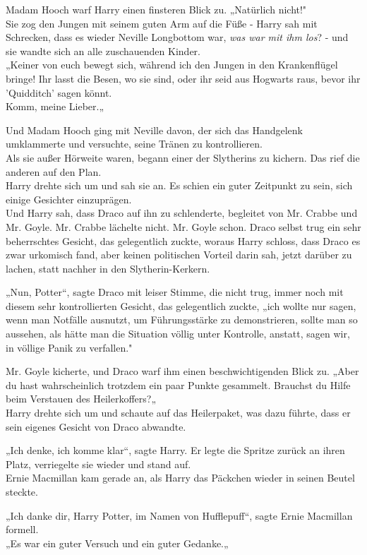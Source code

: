 {Madam Hooch warf Harry einen finsteren Blick zu. „Natürlich nicht!"\\ Sie zog den Jungen mit seinem guten Arm auf die Füße - Harry sah mit Schrecken, dass es wieder Neville Longbottom war, \emph{was war mit ihm los}? - und sie wandte sich an alle zuschauenden Kinder.\\ „Keiner von euch bewegt sich, während ich den Jungen in den Krankenflügel bringe! Ihr lasst die Besen, wo sie sind, oder ihr seid aus Hogwarts raus, bevor ihr 'Quidditch' sagen könnt.\\ Komm, meine Lieber.„

Und Madam Hooch ging mit Neville davon, der sich das Handgelenk umklammerte und versuchte, seine Tränen zu kontrollieren.\\ Als sie außer Hörweite waren, begann einer der Slytherins zu kichern. Das rief die anderen auf den Plan.\\ Harry drehte sich um und sah sie an. Es schien ein guter Zeitpunkt zu sein, sich einige Gesichter einzuprägen.\\ Und Harry sah, dass Draco auf ihn zu schlenderte, begleitet von Mr. Crabbe und Mr. Goyle. Mr. Crabbe lächelte nicht. Mr. Goyle schon. Draco selbst trug ein sehr beherrschtes Gesicht, das gelegentlich zuckte, woraus Harry schloss, dass Draco es zwar urkomisch fand, aber keinen politischen Vorteil darin sah, jetzt darüber zu lachen, statt nachher in den Slytherin-Kerkern.

„Nun, Potter“, sagte Draco mit leiser Stimme, die nicht trug, immer noch mit diesem sehr kontrollierten Gesicht, das gelegentlich zuckte, „ich wollte nur sagen, wenn man Notfälle ausnutzt, um Führungsstärke zu demonstrieren, sollte man so aussehen, als hätte man die Situation völlig unter Kontrolle, anstatt, sagen wir, in völlige Panik zu verfallen."

Mr. Goyle kicherte, und Draco warf ihm einen beschwichtigenden Blick zu. „Aber du hast wahrscheinlich trotzdem ein paar Punkte gesammelt. Brauchst du Hilfe beim Verstauen des Heilerkoffers?„\\ Harry drehte sich um und schaute auf das Heilerpaket, was dazu führte, dass er sein eigenes Gesicht von Draco abwandte.

„Ich denke, ich komme klar“, sagte Harry. Er legte die Spritze zurück an ihren Platz, verriegelte sie wieder und stand auf.\\ Ernie Macmillan kam gerade an, als Harry das Päckchen wieder in seinen Beutel steckte.

„Ich danke dir, Harry Potter, im Namen von Hufflepuff“, sagte Ernie Macmillan formell.\\ „Es war ein guter Versuch und ein guter Gedanke.„

}
